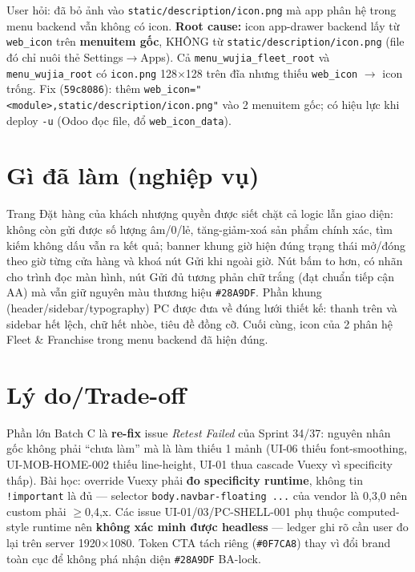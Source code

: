 User hỏi: đã bỏ ảnh vào \texttt{static/description/icon.png} mà app phân hệ trong menu backend vẫn không
có icon. \textbf{Root cause:} icon app-drawer backend lấy từ \texttt{web\_icon} trên \textbf{menuitem gốc},
KHÔNG từ \texttt{static/description/icon.png} (file đó chỉ nuôi thẻ Settings$\to$Apps). Cả
\texttt{menu\_wujia\_fleet\_root} và \texttt{menu\_wujia\_root} có \texttt{icon.png} 128$\times$128 trên đĩa
nhưng thiếu \texttt{web\_icon} $\to$ icon trống. Fix (\texttt{59c8086}): thêm
\texttt{web\_icon="<module>,static/description/icon.png"} vào 2 menuitem gốc; có hiệu lực khi deploy
\texttt{-u} (Odoo đọc file, đổ \texttt{web\_icon\_data}).

\section{Gì đã làm (nghiệp vụ)}

Trang Đặt hàng của khách nhượng quyền được siết chặt cả logic lẫn giao diện: không còn gửi được số lượng
âm/0/lẻ, tăng-giảm-xoá sản phẩm chính xác, tìm kiếm không dấu vẫn ra kết quả; banner khung giờ hiện đúng
trạng thái mở/đóng theo giờ từng cửa hàng và khoá nút Gửi khi ngoài giờ. Nút bấm to hơn, có nhãn cho trình
đọc màn hình, nút Gửi đủ tương phản chữ trắng (đạt chuẩn tiếp cận AA) mà vẫn giữ nguyên màu thương hiệu
\texttt{\#28A9DF}. Phần khung (header/sidebar/typography) PC được đưa về đúng lưới thiết kế: thanh trên và
sidebar hết lệch, chữ hết nhòe, tiêu đề đồng cỡ. Cuối cùng, icon của 2 phân hệ Fleet \& Franchise trong menu
backend đã hiện đúng.

\section{Lý do/Trade-off}

Phần lớn Batch C là \textbf{re-fix} issue \emph{Retest Failed} của Sprint 34/37: nguyên nhân gốc không phải
``chưa làm'' mà là làm thiếu 1 mảnh (UI-06 thiếu font-smoothing, UI-MOB-HOME-002 thiếu line-height, UI-01
thua cascade Vuexy vì specificity thấp). Bài học: override Vuexy phải \textbf{đo specificity runtime}, không
tin \texttt{!important} là đủ --- selector \texttt{body.navbar-floating ...} của vendor là 0,3,0 nên custom
phải $\geq$0,4,x. Các issue UI-01/03/PC-SHELL-001 phụ thuộc computed-style runtime nên \textbf{không xác minh
được headless} --- ledger ghi rõ cần user đo lại trên server 1920$\times$1080. Token CTA tách riêng
(\texttt{\#0F7CA8}) thay vì đổi brand toàn cục để không phá nhận diện \texttt{\#28A9DF} BA-lock.

